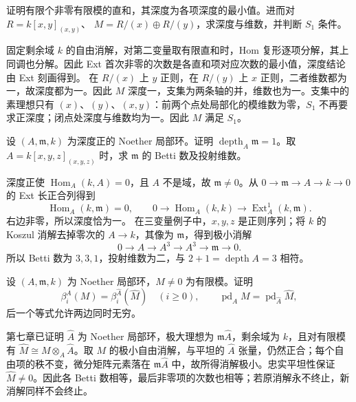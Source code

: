 \begin{exercise}\label{g5:ex:depth-direct-sum}
	证明有限个非零有限模的直和，其深度为各项深度的最小值。进而对 \(R=k[x,y]_{(x,y)}\)、
	\(M=R/(x)\oplus R/(y)\)，求深度与维数，并判断 \(S_1\) 条件。
\end{exercise}
\begin{solution}
	固定剩余域 \(k\) 的自由消解，对第二变量取有限直和时，Hom 复形逐项分解，其上同调也分解。因此 Ext 首次非零的次数是各直和项对应次数的最小值，深度结论由 Ext 刻画得到。
	在 \(R/(x)\) 上 \(y\) 正则，在 \(R/(y)\) 上 \(x\) 正则，二者维数都为一，故深度都为一。因此 \(M\) 深度一，支集为两条轴的并，维数也为一。支集中的素理想只有 \((x)\)、\((y)\)、\((x,y)\)：前两个点处局部化的模维数为零，\(S_1\) 不再要求正深度；闭点处深度与维数均为一。因此 \(M\) 满足 \(S_1\)。
\end{solution}

\begin{exercise}\label{g5:ex:maximal-ideal-depth}
	设 \((A,\mathfrak m,k)\) 为深度正的 Noether 局部环。证明 \(\operatorname{depth}_A\mathfrak m=1\)。取 \(A=k[x,y,z]_{(x,y,z)}\) 时，求 \(\mathfrak m\) 的 Betti 数及投射维数。
\end{exercise}
\begin{solution}
	深度正使 \(\operatorname{Hom}_A(k,A)=0\)，且 \(A\) 不是域，故 \(\mathfrak m\ne0\)。从 \(0\to\mathfrak m\to A\to k\to0\) 的 Ext 长正合列得到
	\[
		\operatorname{Hom}_A(k,\mathfrak m)=0,\qquad
		0\longrightarrow\operatorname{Hom}_A(k,k)
		\longrightarrow\operatorname{Ext}_A^1(k,\mathfrak m).
	\]
	右边非零，所以深度恰为一。
	在三变量例子中，\(x,y,z\) 是正则序列；将 \(k\) 的 Koszul 消解去掉零次的 \(A\to k\)，其像为 \(\mathfrak m\)，得到极小消解
	\[
		0\longrightarrow A\longrightarrow A^3
		\longrightarrow A^3\longrightarrow\mathfrak m\longrightarrow0.
	\]
	所以 Betti 数为 \(3,3,1\)，投射维数为二，与 \(2+1=\operatorname{depth}A=3\) 相符。
\end{solution}

\begin{exercise}\label{g5:ex:completion-betti}
	设 \((A,\mathfrak m,k)\) 为 Noether 局部环，\(M\ne0\) 为有限模。证明
	\[
		\beta_i^A(M)=\beta_i^{\widehat A}(\widehat M)
		\quad(i\geq0),\qquad
		\operatorname{pd}_A M=\operatorname{pd}_{\widehat A}\widehat M,
	\]
	后一个等式允许两边同时无穷。
\end{exercise}
\begin{solution}
	第七章已证明 \(\widehat A\) 为 Noether 局部环，极大理想为 \(\mathfrak m\widehat A\)，剩余域为 \(k\)，且对有限模有 \(\widehat M\cong M\otimes_A\widehat A\)。取 \(M\) 的极小自由消解，与平坦的 \(\widehat A\) 张量，仍然正合；每个自由项的秩不变，微分矩阵元素落在 \(\mathfrak m\widehat A\) 中，故所得消解极小。忠实平坦性保证 \(\widehat M\ne0\)。因此各 Betti 数相等，最后非零项的次数也相等；若原消解永不终止，新消解同样不会终止。
\end{solution}

